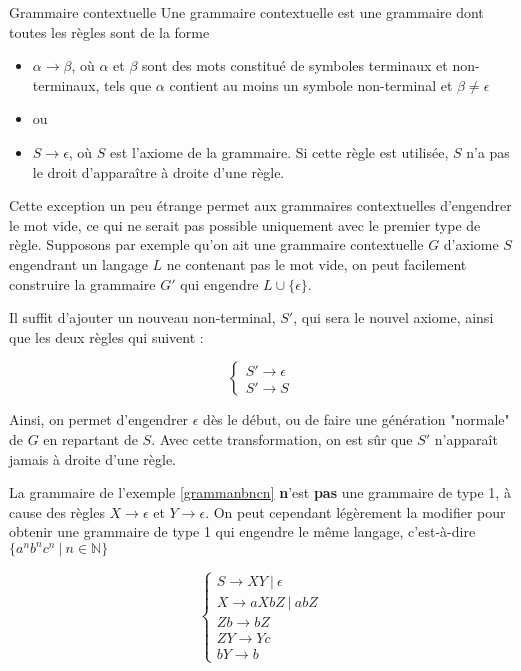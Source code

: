 \begin{definition}{Grammaire contextuelle}{}
Une grammaire contextuelle est une grammaire dont toutes les règles sont de la forme 
\begin{itemize}
\item[] $\alpha \rightarrow \beta$, où $\alpha$ et $\beta$ sont des mots constitué de symboles terminaux et non-terminaux, tels que $\alpha$ contient au moins un symbole non-terminal et $\beta \neq \epsilon$
\item[] ou
\item[] $S \rightarrow \epsilon$, où $S$ est l'axiome de la grammaire. Si cette règle est utilisée, $S$ n'a pas le droit d'apparaître à droite d'une règle.
\end{itemize}

\end{definition}

Cette exception un peu étrange permet aux grammaires contextuelles d'engendrer le mot vide, ce qui ne serait pas possible uniquement avec le premier type de règle. Supposons par exemple qu'on ait une grammaire contextuelle $G$ d'axiome $S$ engendrant un langage $L$ ne contenant pas le mot vide, on peut facilement construire la grammaire $G'$ qui engendre $L \cup \{\epsilon\}$. 

Il suffit d'ajouter un nouveau non-terminal, $S'$, qui sera le nouvel axiome, ainsi que les deux règles qui suivent : 


\[
\begin{cases}
S' \rightarrow \epsilon \\
S' \rightarrow S
\end{cases}
\]

Ainsi, on permet d'engendrer $\epsilon$ dès le début, ou de faire une génération "normale" de $G$ en repartant de $S$. Avec cette transformation, on est sûr que $S'$ n'apparaît jamais à droite d'une règle.

\begin{example}
\label{grammanbncnbis}
La grammaire de l'exemple \ref{grammanbncn} \textbf{n}'est \textbf{pas} une grammaire de type 1, à cause des règles $X \rightarrow \epsilon$ et $Y \rightarrow \epsilon$. On peut cependant légèrement la modifier pour obtenir une grammaire de type 1 qui engendre le même langage, c'est-à-dire $\{a^nb^nc^n ~|~ n \in \mathbb{N}\}$


\[
\begin{cases}
S \rightarrow XY~|~\epsilon \\
X \rightarrow aXbZ~|~abZ\\
Zb \rightarrow bZ \\
ZY \rightarrow Yc \\
bY \rightarrow b
\end{cases}
\]

\end{example}

